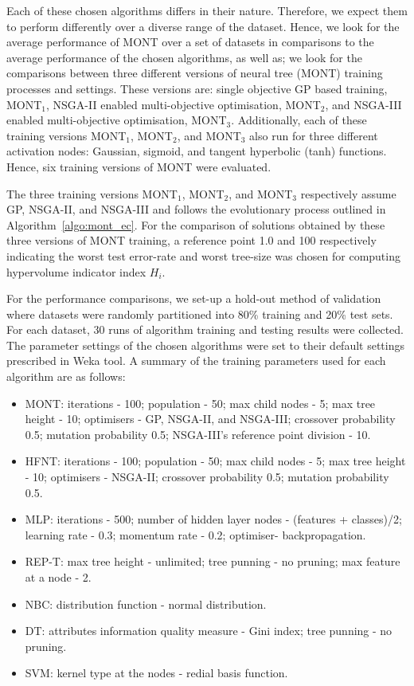 \documentclass[conference]{IEEEtran}
\begin{document}
Each of these chosen algorithms differs in their nature. Therefore, we expect them to perform differently over a diverse range of the dataset. Hence, we look for the average performance of MONT over a set of datasets in comparisons to the average performance of the chosen algorithms, as well as; we look for the comparisons between three different versions of neural tree (MONT) training processes and settings. These versions are: single objective GP based training, MONT$_1$, NSGA-II enabled multi-objective optimisation, MONT$_2$, and NSGA-III enabled multi-objective optimisation, MONT$_3$. Additionally, each of these training versions MONT$_1$, MONT$_2$, and MONT$_3$ also run for three different activation nodes: Gaussian, sigmoid, and tangent hyperbolic (tanh) functions. Hence, six training versions of MONT were evaluated.  

The three training versions MONT$_1$, MONT$_2$, and MONT$_3$ respectively assume GP, NSGA-II, and NSGA-III and follows the evolutionary process outlined in Algorithm~\ref{algo:mont_ec}. For the comparison of solutions obtained by these three versions of MONT training, a reference point 1.0 and 100 respectively indicating the worst test error-rate and worst tree-size was chosen for computing hypervolume indicator index $ H_i $.     

For the performance comparisons, we set-up a hold-out method of validation where datasets were randomly partitioned into 80\% training and 20\% test sets. For each dataset, 30 runs of algorithm training and testing results were collected. The parameter settings of the chosen algorithms were set to their default settings prescribed in Weka tool. A summary of the training parameters used for each algorithm are as follows:
\begin{itemize}
    \item MONT: iterations - 100; population - 50; max child nodes - 5; max tree height - 10; optimisers - GP, NSGA-II, and NSGA-III; crossover probability 0.5; mutation probability 0.5; NSGA-III's reference point division - 10.
    \item HFNT: iterations - 100; population - 50; max child nodes - 5; max tree height - 10; optimisers - NSGA-II; crossover probability 0.5; mutation probability 0.5.
    \item MLP: iterations - 500; number of hidden layer nodes - (features + classes)/2; learning rate - 0.3; momentum rate - 0.2; optimiser-  backpropagation.
    \item REP-T:  max tree height - unlimited; tree punning - no pruning; max feature at a node - 2.
    \item NBC: distribution function - normal distribution.
    \item DT: attributes information quality measure -  Gini index; tree punning - no pruning.
    \item SVM: kernel type at the nodes - redial basis function.
\end{itemize}
\end{document}
